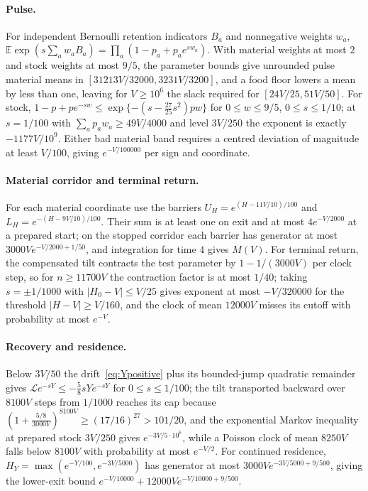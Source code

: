 \documentclass[11pt,a4paper]{article}
\theoremstyle{plain}
\theoremstyle{definition}
\theoremstyle{remark}
\newcommand{\E}{\mathbb E}
\newcommand{\Lgen}{\mathcal L}
\begin{document}
\paragraph{Pulse.}
For independent Bernoulli retention indicators $B_a$ and nonnegative weights $w_a$, $\E\exp(s\sum_aw_aB_a)=\prod_a(1-p_a+p_ae^{sw_a})$. With material weights at most $2$ and stock weights at most $9/5$, the parameter bounds give unrounded pulse material means in $[31213V/32000,3231V/3200]$, and a food floor lowers a mean by less than one, leaving for $V\ge10^6$ the slack required for $[24V/25,51V/50]$. For stock, $1-p+pe^{-sw}\le\exp\{-(s-\tfrac{27}{25}s^2)pw\}$ for $0\le w\le9/5$, $0\le s\le1/10$; at $s=1/100$ with $\sum_ap_aw_a\ge49V/4000$ and level $3V/250$ the exponent is exactly $-1177V/10^{9}$. Either bad material band requires a centred deviation of magnitude at least $V/100$, giving $e^{-V/100000}$ per sign and coordinate.

\paragraph{Material corridor and terminal return.}
For each material coordinate use the barriers $U_H=e^{(H-11V/10)/100}$ and $L_H=e^{-(H-9V/10)/100}$. Their sum is at least one on exit and at most $4e^{-V/2000}$ at a prepared start; on the stopped corridor each barrier has generator at most $3000Ve^{-V/2000+1/50}$, and integration for time $4$ gives $M(V)$. For terminal return, the compensated tilt contracts the test parameter by $1-1/(3000V)$ per clock step, so for $n\ge11700V$ the contraction factor is at most $1/40$; taking $s=\pm1/1000$ with $|H_0-V|\le V/25$ gives exponent at most $-V/320000$ for the threshold $|H-V|\ge V/160$, and the clock of mean $12000V$ misses its cutoff with probability at most $e^{-V}$.

\paragraph{Recovery and residence.}
Below $3V/50$ the drift~\eqref{eq:Ypositive} plus its bounded-jump quadratic remainder gives $\Lgen e^{-sY}\le-\tfrac58sYe^{-sY}$ for $0\le s\le1/100$; the tilt transported backward over $8100V$ steps from $1/1000$ reaches its cap because $(1+\tfrac{5/8}{3000V})^{8100V}\ge(17/16)^{27}>101/20$, and the exponential Markov inequality at prepared stock $3V/250$ gives $e^{-3V/5\cdot10^6}$, while a Poisson clock of mean $8250V$ falls below $8100V$ with probability at most $e^{-V/2}$. For continued residence, $H_Y=\max(e^{-Y/100},e^{-3V/5000})$ has generator at most $3000Ve^{-3V/5000+9/500}$, giving the lower-exit bound $e^{-V/10000}+12000Ve^{-V/10000+9/500}$.
\end{document}
